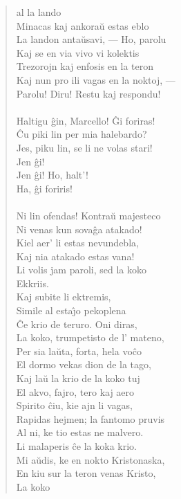 \begin{verse}
al la lando\\ Minacas kaj ankora\u u estas eblo\\ La landon anta\u
usavi, --- Ho, parolu\\ Kaj se en via vivo vi kolektis\\ Trezorojn
kaj enfosis en la teron\\ Kaj nun pro ili vagas en la noktoj, ---\\
Parolu! Diru! Restu kaj respondu!\\
\\
 Haltigu \^gin, Marcello! \^Gi foriras!\\
 \^Cu piki lin per mia halebardo?\\
 Jes, piku lin, se li ne volas stari!\\
 Jen \^gi!\\
 Jen \^gi! Ho, halt'!\\
 Ha, \^gi foriris! \\
\\ Ni lin
ofendas! Kontra\u u majesteco\\ Ni venas kun sova\^ga atakado!\\
Kiel aer' li estas nevundebla,\\ Kaj nia atakado estas vana!\\
 Li volis jam paroli, sed la koko \\Ekkriis.\\
 Kaj subite li ektremis,\\ Simile al esta\^{\j}o
pekoplena\\ \^Ce krio de teruro. Oni diras,\\ La koko, trumpetisto
de l' mateno,\\ Per sia la\u uta, forta, hela vo\^co\\ El dormo
vekas dion de la tago,\\ Kaj la\u u la krio de la koko tuj\\ El
akvo, fajro, tero kaj aero\\ Spirito \^ciu, kie ajn li vagas,\\
Rapidas hejmen; la fantomo pruvis\\ Al ni, ke tio estas ne malvero.\\
 Li malaperis \^ce la koka krio.\\ Mi a\u udis, ke en
nokto Kristonaska,\\ En kiu sur la teron venas Kristo,\\ La koko

\end{verse}
